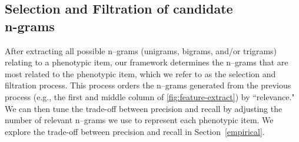 \documentclass{sig-alternate-05-2015}
\newcommand{\kibitz}[2]{\ifnum\Comments=1\textcolor{#1}{#2}\fi}
\newcommand{\joyce}[1]{\kibitz{purple}      {[Joyce: #1]}}
\newcommand{\jette}[1]{\kibitz{red}      {[Jette: #1]}}
\begin{document}



\subsection{Selection and Filtration of candidate \\n-grams}
After extracting all possible n--grams (unigrams, bigrams, and/or trigrams) relating to a phenotypic item, our framework determines the n--grams that are most related to the phenotypic item, which we refer to as the selection and filtration process.
This process orders the n--grams generated from the previous process (e.g., the first and middle column of \ref{fig:feature-extract}) by ``relevance." 
We can then tune the trade-off between precision and recall by adjusting the number of relevant n--grams we use to represent each phenotypic item. 
We explore the trade-off between precision and recall in Section~\ref{empirical}.
\end{document}

